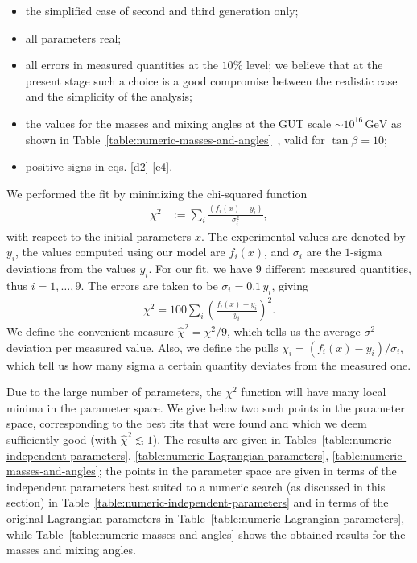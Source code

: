 \documentclass[a4paper,12pt]{article}
\begin{document}
\begin{itemize}

\item
the simplified case of second and third generation only;

\item
all parameters real;

\item
all errors in measured quantities at the $10\%$ level; we believe that at the present stage such a choice is a good compromise between the realistic case and
the simplicity of the analysis;

\item
the values for the masses and mixing angles at the GUT scale $\sim 10^{16}\,\mathrm{GeV}$ as shown in Table~\ref{table:numeric-masses-and-angles}~\cite{Xing:2007fb}, valid for $\tan{\beta}=10$;

\item
positive signs in eqs. \eqref{d2}-\eqref{e4}.

\end{itemize}

We performed the fit by minimizing the chi-squared function \begin{align}
\chi^2&:=\sum_{i}{\frac{(f_i(x)-y_i)}{\sigma_i^2}},
\end{align}
with respect to the initial parameters $x$. The experimental values are denoted by $y_i$, the values computed using our model are $f_i(x)$, and $\sigma_i$ are the $1$-sigma deviations from the values $y_i$. For our fit, we have $9$ different measured quantities, thus $i=1,\ldots,9$. The errors are taken to be $\sigma_i=0.1\,y_i$, giving
\begin{align}
\chi^2=100\sum_i \left(\frac{f_i(x)-y_i}{y_i}\right)^2.
\end{align}
We define the convenient measure $\hat{\chi}^2=\chi^2/9$, which tells us the average $\sigma^2$ deviation per measured value. Also, we define the pulls $\chi_i=(f_i(x)-y_i)/\sigma_i$, which tell us how many sigma a certain quantity deviates from the measured one.

Due to the large number of parameters, the $\chi^2$ function will have many local minima in the parameter space. We give below two such points in the parameter space, corresponding to the best fits that were found and which we deem sufficiently good (with $\hat{\chi}^2 \lesssim 1$). The results are given in Tables~\ref{table:numeric-independent-parameters}, \ref{table:numeric-Lagrangian-parameters}, \ref{table:numeric-masses-and-angles}; the points in the parameter space are given in terms of the independent parameters best suited to a numeric search (as discussed in this section) in Table~\ref{table:numeric-independent-parameters} and in terms of the original Lagrangian parameters in Table~\ref{table:numeric-Lagrangian-parameters}, while Table~\ref{table:numeric-masses-and-angles} shows the obtained results for the masses and mixing angles.
\end{document}
